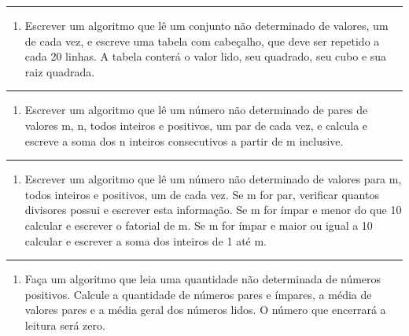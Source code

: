 \documentclass[12pt,a4paper]{article}
\providecommand{\tightlist}{%
      \setlength{\itemsep}{0pt}\setlength{\parskip}{0pt}}
\begin{document}
    \begin{center}\rule{0.5\linewidth}{0.5pt}\end{center}

\begin{enumerate}
\def\labelenumi{\arabic{enumi}.}
\setcounter{enumi}{6}
\tightlist
\item
  Escrever um algoritmo que lê um conjunto não determinado de valores,
  um de cada vez, e escreve uma tabela com cabeçalho, que deve ser
  repetido a cada 20 linhas. A tabela conterá o valor lido, seu
  quadrado, seu cubo e sua raiz quadrada.
\end{enumerate}

    \begin{center}\rule{0.5\linewidth}{0.5pt}\end{center}

\begin{enumerate}
\def\labelenumi{\arabic{enumi}.}
\setcounter{enumi}{7}
\tightlist
\item
  Escrever um algoritmo que lê um número não determinado de pares de
  valores m, n, todos inteiros e positivos, um par de cada vez, e
  calcula e escreve a soma dos n inteiros consecutivos a partir de m
  inclusive.
\end{enumerate}

    \begin{center}\rule{0.5\linewidth}{0.5pt}\end{center}

\begin{enumerate}
\def\labelenumi{\arabic{enumi}.}
\setcounter{enumi}{8}
\tightlist
\item
  Escrever um algoritmo que lê um número não determinado de valores para
  m, todos inteiros e positivos, um de cada vez. Se m for par, verificar
  quantos divisores possui e escrever esta informação. Se m for ímpar e
  menor do que 10 calcular e escrever o fatorial de m. Se m for ímpar e
  maior ou igual a 10 calcular e escrever a soma dos inteiros de 1 até
  m.
\end{enumerate}

    \begin{center}\rule{0.5\linewidth}{0.5pt}\end{center}

\begin{enumerate}
\def\labelenumi{\arabic{enumi}.}
\setcounter{enumi}{9}
\tightlist
\item
  Faça um algoritmo que leia uma quantidade não determinada de números
  positivos. Calcule a quantidade de números pares e ímpares, a média de
  valores pares e a média geral dos números lidos. O número que
  encerrará a leitura será zero.
\end{enumerate}
\end{document}
